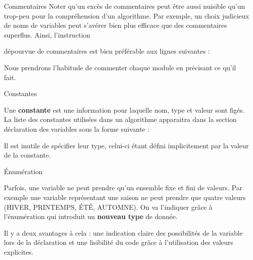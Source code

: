 \begin{frame}{Commentaires}
	Noter qu’un excès de commentaires peut être aussi nuisible qu’un
	trop-peu pour la compréhension d’un algorithme. Par exemple, un choix
	judicieux de noms de variables peut s’avérer bien plus efficace que des
	commentaires superflus. Ainsi, l’instruction


	dépourvue de commentaires est bien préférable aux lignes suivantes :

	
	Nous prendrons l'habitude de commenter chaque module en précisant ce qu'il fait.
\end{frame}

\begin{frame}{Constantes}

	Une \textbf{constante} est une information pour laquelle nom, type et
	valeur sont figés. La liste des constantes utilisées dans un algorithme
	apparaitra dans la section déclaration des variables sous la forme
	suivante :


	Il est inutile de spécifier leur type, celui-ci
	étant défini implicitement par la valeur de la constante.
\end{frame}

\begin{frame}{Énumération}

	Parfois, une variable ne peut prendre qu'un ensemble
	fixe et fini de valeurs. Par exemple une variable représentant une
	saison ne peut prendre que quatre valeurs (HIVER, PRINTEMPS, ÉTÉ,
	AUTOMNE). On va l'indiquer grâce à
	l'énumération qui introduit un \textbf{nouveau type}
	de donnée.


	Il y a deux avantages à cela : une indication claire des possibilités de
	la variable lors de la déclaration et une lisibilité du code grâce à
	l'utilisation des valeurs explicites.
\end{frame}

